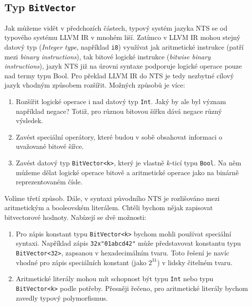 \documentclass[12pt]{fithesis2}
\begin{document}
\subsection{Typ \texttt{BitVector}}
\label{subsec:nts-extensions:bitvector}
Jak můžeme vidět v předchozích částech, typový systém jazyka NTS se od typového systému LLVM IR 
v mnohém liší. Zatímco v LLVM IR mohou stejný datový typ (\textit{Integer type}, například \texttt{i8}) využívat jak aritmetické instrukce (patří mezi \textit{binary instructions}), tak bitové logické instrukce (\textit{bitwise binary instructions}), jazyk NTS již na úrovni syntaxe podporuje logické operace pouze nad termy typu Bool. Pro překlad LLVM IR do NTS je tedy nezbytné cílový jazyk vhodným způsobem rozšířit. Možných způsobů je více:
\begin{enumerate}
\item Rozšířit logické operace i nad datový typ \texttt{Int}. Jaký by ale byl význam například negace? Totiž, pro různou bitovou šířku dává negace různý výsledek.

\item Zavést speciální operátory, které budou v sobě obsahovat informaci o uvažované bitové šířce.

\item Zavést datový typ \texttt{BitVector<k>}, který je vlastně $k$-ticí typu \texttt{Bool}. Na něm můžeme dělat logické operace bitově a aritmetické operace jako na binárně reprezentovaném čísle. 
\end{enumerate}
Volíme třetí způsob. Dále, v syntaxi původního NTS je rozlišováno mezi aritmetickým a booleovském literálem. Chtěli bychom nějak zapisovat bitvectorové hodnoty. Nabízejí se dvě možnosti:
\begin{enumerate}

\item Pro zápis konstant typu \texttt{BitVector<k>} bychom mohli používat speciální syntaxi. Například zápis \texttt{32x"01abcd42"} může představovat konstantu typu \texttt{BitVector<32>}, zapsanou v hexadecimálním tvaru. Toto řešení je navíc vhodné pro zápis speciálních konstant (jako $2^{31}$) v lidsky čitelném tvaru. 

\item Aritmetické literály mohou mít schopnost být typu \texttt{Int} nebo typu \texttt{BitVector<k>} podle potřeby. Přesněji řečeno, pro aritmetické literály bychom zavedly typový polymorfismus.

\end{enumerate}
\end{document}
